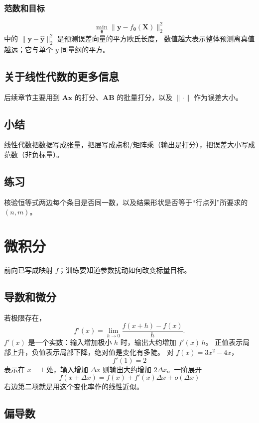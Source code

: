 \subsubsection{范数和目标}

\[
\min_{\bm{\theta}}
\bigl\|\bm{y}-f_{\bm{\theta}}(\bm{X})\bigr\|_2^2
\]
中的 $\|\bm{y}-\hat{\bm{y}}\|_2^2$ 是预测误差向量的平方欧氏长度，
数值越大表示整体预测离真值越远；它与单个 $y$ 同量纲的平方。

\subsection{关于线性代数的更多信息}

后续章节主要用到 $\bm{A}\bm{x}$ 的打分、$\bm{A}\bm{B}$ 的批量打分，以及 $\|\cdot\|$ 作为误差大小。

\subsection{小结}

线性代数把数据写成张量，把层写成点积/矩阵乘（输出是打分），把误差大小写成范数（非负标量）。

\subsection{练习}

核验恒等式两边每个条目是否同一数，以及结果形状是否等于“行点列”所要求的 $(n,m)$。

\section{微积分}

前向已写成映射 $f$；训练要知道参数扰动如何改变标量目标。

\subsection{导数和微分}

若极限存在，
\[
f'(x)
=
\lim_{h\to 0}\frac{f(x+h)-f(x)}{h}.
\]
$f'(x)$ 是一个实数：输入增加极小 $h$ 时，输出大约增加 $f'(x)\,h$。
正值表示局部上升，负值表示局部下降，绝对值是变化有多陡。
对 $f(x)=3x^2-4x$，
\[
f'(1)=2
\]
表示在 $x=1$ 处，输入增加 $\Delta x$ 则输出大约增加 $2\Delta x$。一阶展开
\[
f(x+\Delta x)=f(x)+f'(x)\Delta x+o(\Delta x)
\]
右边第二项就是用这个变化率作的线性近似。

\subsection{偏导数}

